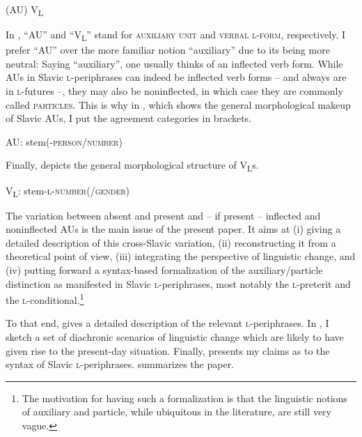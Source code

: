 \documentclass[output=paper]{langscibook}
\begin{document}
\ea (AU) V\textsubscript{L} \label{pitsch:ex:definition} 
\z

\noindent In , ``AU'' and ``V\textsubscript{L}'' stand for \textsc{auxiliary unit} and \textsc{verbal \textsc{l-}form}, respectively. I prefer ``AU'' over the more familiar notion ``auxiliary'' due to its being more neutral: Saying ``auxiliary'', one usually thinks of an inflected verb form. While AUs in Slavic \textsc{l-}periphrases can indeed be inflected verb forms -- and always are in \textsc{l-}futures --, they may also be noninflected, in which case they are commonly called \textsc{particles}. This is why in , which shows the general morphological makeup of Slavic AUs, I put the agreement categories in brackets.

\ea AU: stem(-\textsc{person/number}) \label{pitsch:ex:aux} \z
    
\noindent Finally,  depicts the general morphological structure of V\textsubscript{L}s.
 
\ea V\textsubscript{L}: stem\textsc{-l-}\textsc{number(/gender)} \label{pitsch:ex:lform} \z

\noindent The variation between absent and present and -- if present -- inflected and noninflected AUs is the main issue of the present paper. It aims at (i) giving a detailed description of this cross-Slavic variation, (ii) reconstructing it from a theoretical point of view, (iii) integrating the perspective of linguistic change, and (iv) putting forward a syntax-based formalization of the auxiliary/particle distinction as manifested in Slavic \textsc{l-}periphrases, most notably the \textsc{l-}preterit and the \textsc{l-}conditional.\footnote{The motivation for having such a formalization is that the linguistic notions of auxiliary and particle, while ubiquitous in the literature, are still very vague.}

To that end,  gives a detailed description of the relevant \textsc{l-}periphrases.
In , I sketch a set of diachronic scenarios of linguistic change which are likely to have given rise to the present-day situation. Finally,  presents my claims as to the syntax of Slavic \textsc{l-}periphrases.  summarizes the paper.
\end{document}

